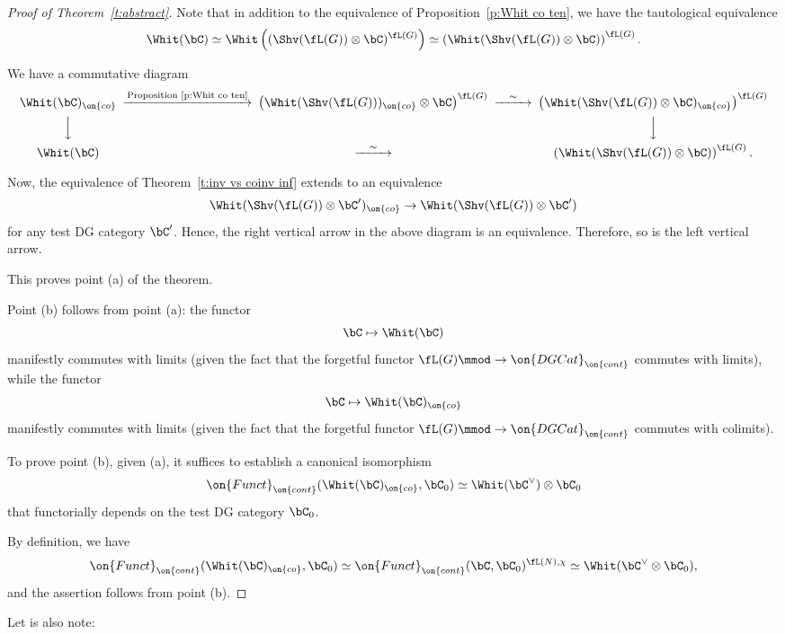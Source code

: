 \documentclass[9pt]{amsart}
\theoremstyle{definition}
\theoremstyle{remark}
\newcommand{\thmref}[1]{Theorem~\ref{#1}}
\newcommand{\propref}[1]{Proposition~\ref{#1}}
\numberwithin{equation}{section}
\begin{document}
\begin{proof}[Proof of \thmref{t:abstract}]

Note that in addition to the equivalence of \propref{p:Whit co ten}, we have the tautological equivalence
$$\Whit(\bC)\simeq \Whit\left((\Shv(\fL(G))\otimes \bC)^{\fL(G)}\right)\simeq \left(\Whit(\Shv(\fL(G))\otimes \bC)\right)^{\fL(G)}.$$

We have a commutative diagram
$$
\CD
\Whit(\bC)_{\on{co}}   @>{\text{\propref{p:Whit co ten}}}>>  \left(\Whit(\Shv(\fL(G)))_{\on{co}}\otimes \bC\right)^{\fL(G)} @>{\sim}>> \left(\Whit(\Shv(\fL(G))\otimes \bC)_{\on{co}}\right)^{\fL(G)} \\
@VVV  & & @VVV  \\
\Whit(\bC)  &  @>{\sim}>>   &   \left(\Whit(\Shv(\fL(G))\otimes \bC)\right)^{\fL(G)}.
\endCD
$$

Now, the equivalence of \thmref{t:inv vs coinv inf} extends to an equivalence
$$\Whit(\Shv(\fL(G))\otimes \bC') _{\on{co}}\to \Whit(\Shv(\fL(G))\otimes \bC')$$
for any test DG category $\bC'$. Hence, the right vertical arrow in the above diagram is an equivalence.
Therefore, so is the left vertical arrow. 

\medskip

This proves point (a) of the theorem. 

\medskip

Point (b) follows from point (a): the functor 
$$\bC\mapsto \Whit(\bC)$$
manifestly commutes with limits (given the fact that the forgetful functor $\fL(G)\mmod \to \on{DGCat}_{\on{cont}}$
commutes with limits), while the functor 
$$\bC\mapsto \Whit(\bC)_{\on{co}}$$
manifestly commutes with limits (given the fact that the forgetful functor $\fL(G)\mmod \to \on{DGCat}_{\on{cont}}$
commutes with colimits). 

\medskip

To prove point (b), given (a), it suffices to establish a canonical isomorphism
$$\on{Funct}_{\on{cont}}(\Whit(\bC)_{\on{co}},\bC_0)\simeq \Whit(\bC^\vee)\otimes \bC_0$$
that functorially depends on the test DG category $\bC_0$.

\medskip

By definition, we have
$$\on{Funct}_{\on{cont}}(\Whit(\bC)_{\on{co}},\bC_0)\simeq 
\on{Funct}_{\on{cont}}(\bC,\bC_0)^{\fL(N),\chi}\simeq \Whit(\bC^\vee \otimes \bC_0),$$
and the assertion follows from point (b). 

\end{proof}

Let is also note:
\end{document}
